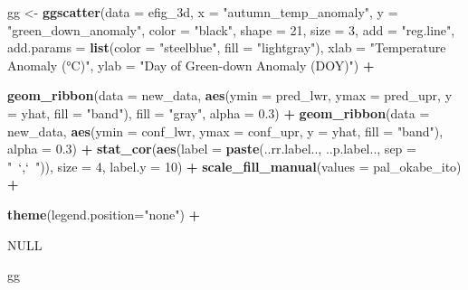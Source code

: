 \documentclass[]{book}
\newenvironment{Shaded}{\begin{snugshade}}{\end{snugshade}}
\newcommand{\DataTypeTok}[1]{\textcolor[rgb]{0.13,0.29,0.53}{#1}}
\newcommand{\DecValTok}[1]{\textcolor[rgb]{0.00,0.00,0.81}{#1}}
\newcommand{\FloatTok}[1]{\textcolor[rgb]{0.00,0.00,0.81}{#1}}
\newcommand{\KeywordTok}[1]{\textcolor[rgb]{0.13,0.29,0.53}{\textbf{#1}}}
\newcommand{\NormalTok}[1]{#1}
\newcommand{\OperatorTok}[1]{\textcolor[rgb]{0.81,0.36,0.00}{\textbf{#1}}}
\newcommand{\OtherTok}[1]{\textcolor[rgb]{0.56,0.35,0.01}{#1}}
\newcommand{\StringTok}[1]{\textcolor[rgb]{0.31,0.60,0.02}{#1}}
\begin{document}
\begin{Shaded}
\begin{Highlighting}[]
\NormalTok{gg <-}\StringTok{ }\KeywordTok{ggscatter}\NormalTok{(}\DataTypeTok{data =}\NormalTok{ efig_3d,}
          \DataTypeTok{x =} \StringTok{"autumn_temp_anomaly"}\NormalTok{,}
          \DataTypeTok{y =} \StringTok{"green_down_anomaly"}\NormalTok{,}
          \DataTypeTok{color =} \StringTok{"black"}\NormalTok{,}
          \DataTypeTok{shape =} \DecValTok{21}\NormalTok{,}
          \DataTypeTok{size =} \DecValTok{3}\NormalTok{,}
          \DataTypeTok{add =} \StringTok{"reg.line"}\NormalTok{,}
          \DataTypeTok{add.params =} \KeywordTok{list}\NormalTok{(}\DataTypeTok{color =} \StringTok{"steelblue"}\NormalTok{,}
                            \DataTypeTok{fill =} \StringTok{"lightgray"}\NormalTok{),}
          \DataTypeTok{xlab =} \StringTok{"Temperature Anomaly (°C)"}\NormalTok{,}
          \DataTypeTok{ylab =} \StringTok{"Day of Green-down Anomaly (DOY)"}\NormalTok{) }\OperatorTok{+}

\StringTok{  }\KeywordTok{geom_ribbon}\NormalTok{(}\DataTypeTok{data =}\NormalTok{ new_data,}
              \KeywordTok{aes}\NormalTok{(}\DataTypeTok{ymin =}\NormalTok{ pred_lwr,}
                  \DataTypeTok{ymax =}\NormalTok{ pred_upr,}
                  \DataTypeTok{y =}\NormalTok{ yhat,}
                  \DataTypeTok{fill =} \StringTok{"band"}\NormalTok{),}
              \DataTypeTok{fill =} \StringTok{"gray"}\NormalTok{,}
              \DataTypeTok{alpha =} \FloatTok{0.3}\NormalTok{) }\OperatorTok{+}
\StringTok{  }
\StringTok{  }\KeywordTok{geom_ribbon}\NormalTok{(}\DataTypeTok{data =}\NormalTok{ new_data,}
              \KeywordTok{aes}\NormalTok{(}\DataTypeTok{ymin =}\NormalTok{ conf_lwr,}
                  \DataTypeTok{ymax =}\NormalTok{ conf_upr,}
                  \DataTypeTok{y =}\NormalTok{ yhat,}
                  \DataTypeTok{fill =} \StringTok{"band"}\NormalTok{), }\DataTypeTok{alpha =} \FloatTok{0.3}\NormalTok{) }\OperatorTok{+}
\StringTok{  }
\StringTok{  }\KeywordTok{stat_cor}\NormalTok{(}\KeywordTok{aes}\NormalTok{(}\DataTypeTok{label =} \KeywordTok{paste}\NormalTok{(..rr.label.., ..p.label.., }\DataTypeTok{sep =} \StringTok{"~`,`~"}\NormalTok{)),}
           \DataTypeTok{size =} \DecValTok{4}\NormalTok{,}
           \DataTypeTok{label.y =} \DecValTok{10}\NormalTok{) }\OperatorTok{+}
\StringTok{  }
\StringTok{  }\KeywordTok{scale_fill_manual}\NormalTok{(}\DataTypeTok{values =}\NormalTok{ pal_okabe_ito) }\OperatorTok{+}

\StringTok{  }\KeywordTok{theme}\NormalTok{(}\DataTypeTok{legend.position=}\StringTok{"none"}\NormalTok{) }\OperatorTok{+}

\StringTok{  }\OtherTok{NULL}  

\NormalTok{gg}
\end{Highlighting}
\end{Shaded}
\end{document}
